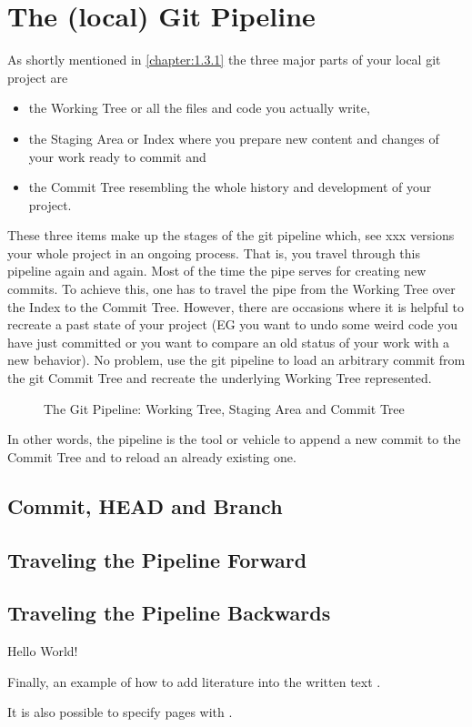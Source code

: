 \chapter{The (local) Git Pipeline}
\label{chapter:2}

As shortly mentioned in \cref{chapter:1.3.1} the three major parts of your local git project are
\begin{itemize}
	\item the Working Tree or all the files and code you actually write,
	\item the Staging Area or Index where you prepare new content and changes of your work ready to commit and 
	\item the Commit Tree resembling the whole history and development of your project. 
\end{itemize}
These three items make up the stages of the git pipeline which, see xxx versions your whole project in an ongoing process. That is,
you travel through this pipeline again and again. Most of the time the pipe serves for creating new commits. To achieve this, one has to 
travel the pipe from the Working Tree over the Index to the Commit Tree. However, there are occasions where it is helpful to recreate a past state 
of your project (\ac{EG} you want to undo some weird code you have just committed or you want to compare an old status of your work with a new behavior).
No problem, use the git pipeline to load an arbitrary commit from the git Commit Tree and recreate the underlying Working Tree represented.

\begin{figure}[H]
	\centering
	
	\caption{The Git Pipeline: Working Tree, Staging Area and Commit Tree}
	\label{fig}
\end{figure}

In other words, the pipeline is the tool or vehicle to append a new commit to the Commit Tree and to reload an already existing one.

 


\section{Commit, HEAD and Branch}
\label{chapter:2.1}


\section{Traveling the Pipeline Forward}
\label{chapter:2.2}


\section{Traveling the Pipeline Backwards}
\label{chapter:2.3}

Hello World!

Finally, an example of how to add literature into the written text \cite{meyers2005effective}.

It is also possible to specify pages with \cite[see][page 127]{arens2015mathematik}.